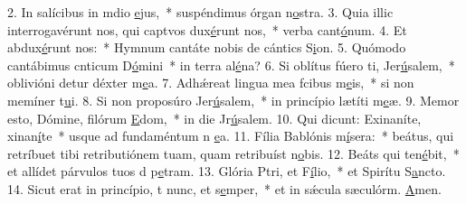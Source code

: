 2. In salícibus in mdio \uline{e}jus,~* suspéndimus órgan n\uline{o}stra.
3. Quia illic interrogavérunt nos, qui captvos dux\uline{é}runt nos,~* verba cant\uline{ó}num.
4. Et  abdux\uline{é}runt nos:~* Hymnum cantáte nobis de cántics S\uline{i}on.
5. Quómodo cantábimus cnticum D\uline{ó}mini~* in terra al\uline{é}na?
6. Si oblítus fúero ti, Jer\uline{ú}salem,~* oblivióni detur déxter m\uline{e}a.
7. Adhǽreat lingua mea fcibus m\uline{e}is,~* si non memíner t\uline{u}i.
8. Si non proposúro Jer\uline{ú}salem,~* in princípio lætíti m\uline{e}æ.
9. Memor esto, Dómine, filórum \uline{E}dom,~* in die Jr\uline{ú}salem.
10. Qui dicunt: Exinaníte, xinan\uline{í}te~* usque ad fundaméntum n \uline{e}a.
11. Fília Bablónis m\uline{í}sera:~* beátus, qui retríbuet tibi retributiónem tuam, quam retribuíst n\uline{o}bis.
12. Beáts qui ten\uline{é}bit,~* et allídet párvulos tuos d p\uline{e}tram.
13. Glória Ptri, et F\uline{í}lio,~* et Spirítu S\uline{a}ncto.
14. Sicut erat in princípio, t nunc, et s\uline{e}mper,~* et in sǽcula sæculórm. \uline{A}men.
